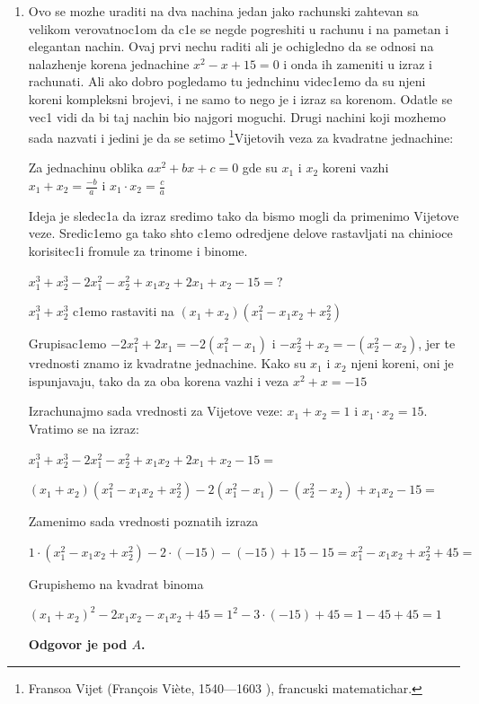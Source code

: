 \documentclass[a4paper,12pt]{article}
\newcommand{\Lat}{\fontencoding{OT1}\selectfont}
\begin{document}
\begin{enumerate}[1.]
\item Ovo se mozhe uraditi na dva nachina jedan jako rachunski zahtevan sa velikom verovatnoc1om da c1e se negde pogreshiti u rachunu i na pametan i elegantan nachin. Ovaj prvi nechu raditi ali je ochigledno da se odnosi na nalazhenje korena jednachine $x^2 - x + 15 = 0$ i onda ih zameniti u izraz i rachunati. Ali ako dobro pogledamo tu jednchinu videc1emo da su njeni koreni kompleksni brojevi, i ne samo to nego je i izraz sa korenom. Odatle se vec1 vidi da bi taj nachin bio najgori moguchi. Drugi nachini koji mozhemo sada nazvati i jedini je da se setimo \footnote{ Fransoa Vijet ({\Lat Fran\c{c}ois Vi\`{e}te, 1540---1603 }), francuski matematichar.}{Vijetovih} veza za kvadratne jednachine:
\par Za jednachinu oblika $ax^2 + bx + c = 0$ gde su $x_1$ i $x_2$ koreni vazhi $x_1 + x_2 = \frac{-b}{a}$ i $x_1 \cdot x_2 = \frac{c}{a}$
\par Ideja je sledec1a da izraz sredimo tako da bismo mogli da primenimo Vijetove veze. Sredic1emo ga tako shto c1emo odredjene delove rastavljati na chinioce korisitec1i fromule za trinome i binome.
\par $x_1^3 + x_2^3 - 2x_1^2 - x_2^2 + x_1x_2 + 2x_1 + x_2 -15 = ?$
\par $x_1^3 + x_2^3$ c1emo rastaviti na $(x_1 + x_2)(x_1^2 -x_1x_2 + x_2^2 )$
\par Grupisac1emo $-2x_1^2 +2x_1 = -2(x_1^2 -x_1)$ i $-x_2^2 +x_2 = - (x_2^2 -x_2)$, jer te vrednosti znamo iz kvadratne jednachine. Kako su $x_1$ i $x_2$ njeni koreni, oni je ispunjavaju, tako da za oba korena vazhi i veza $x^2 + x = -15$
\par Izrachunajmo sada vrednosti za Vijetove veze: $x_1 + x_2 = 1$ i $x_1 \cdot x_2 = 15$. Vratimo se na izraz:
\par $x_1^3 + x_2^3 - 2x_1^2 - x_2^2 + x_1x_2 + 2x_1 + x_2 -15 = $
\par $(x_1 + x_2)(x_1^2 -x_1x_2 + x_2^2 ) -2(x_1^2 -x_1) - (x_2^2 -x_2) +x_1x_2 - 15=  $
\par Zamenimo sada vrednosti poznatih izraza
\par $ 1 \cdot(x_1^2 -x_1x_2 + x_2^2 ) -2 \cdot(-15) - (-15) +15 - 15 = x_1^2 -x_1x_2 + x_2^2 + 45 = $
\par Grupishemo na kvadrat binoma
\par $(x_1 + x_2)^2 - 2x_1x_2 - x_1x_2 + 45 = 1^2 -3 \cdot (-15) + 45 = 1 - 45 + 45 = 1$
\par \textbf{Odgovor je pod $A$.}


\end{enumerate}
\end{document}
